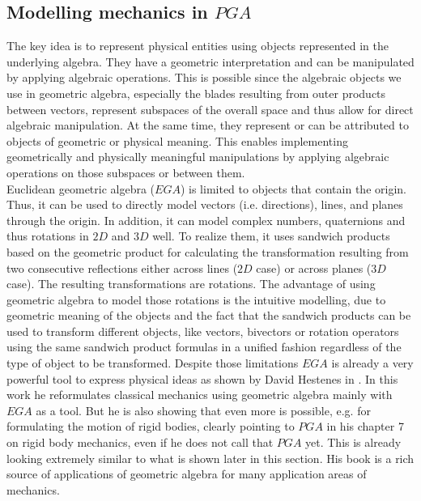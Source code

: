 \subsection{Modelling mechanics in $PGA$}
\label{subsection:modelling_mechanics}

The key idea is to represent physical entities using objects represented in the underlying
algebra. They have a geometric interpretation and can be manipulated by applying algebraic
operations. This is possible since the algebraic objects we use in geometric algebra,
especially the blades resulting from outer products between vectors, represent subspaces
of the overall space and thus allow for direct algebraic manipulation. At the same time,
they represent or can be attributed to objects of geometric or physical meaning. This
enables implementing geometrically and physically meaningful manipulations by applying
algebraic operations on those subspaces or between them. \\

Euclidean geometric algebra ($EGA$) is limited to objects that contain the origin. Thus,
it can be used to directly model vectors (i.e. directions), lines, and planes through the
origin. In addition, it can model complex numbers, quaternions and thus rotations in $2D$
and $3D$ well. To realize them, it uses sandwich products based on the geometric product
for calculating the transformation resulting from two consecutive reflections either
across lines ($2D$ case) or across planes ($3D$ case). The resulting transformations are
rotations. The advantage of using geometric algebra to model those rotations is the
intuitive modelling, due to geometric meaning of the objects and the fact that the
sandwich products can be used to transform different objects, like vectors, bivectors or
rotation operators using the same sandwich product formulas in a unified fashion
regardless of the type of object to be transformed. Despite those limitations $EGA$ is
already a very powerful tool to express physical ideas as shown by David Hestenes in
\cite{David_Hestenes_NFCM:1986}. In this work he reformulates classical mechanics using
geometric algebra mainly with $EGA$ as a tool. But he is also showing that even more is
possible, e.g. for formulating the motion of rigid bodies, clearly pointing to $PGA$ in
his chapter 7 on rigid body mechanics, even if he does not call that $PGA$ yet. This is
already looking extremely similar to what is shown later in this section. His book is a
rich source of applications of geometric algebra for many application areas of
mechanics.\\


